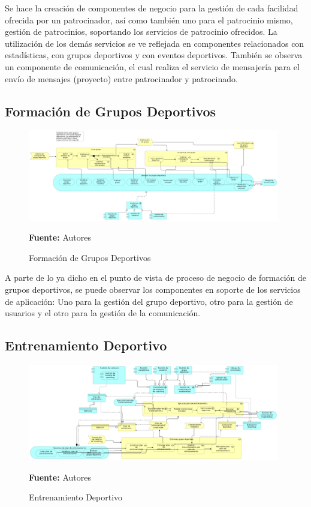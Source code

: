 Se hace la creación de componentes de negocio para la gestión de cada facilidad ofrecida por un patrocinador, así como también uno para el patrocinio mismo, gestión de patrocinios, soportando los servicios de patrocinio ofrecidos. La utilización de los demás servicios se ve reflejada en componentes relacionados con estadísticas, con grupos deportivos y con eventos deportivos. También se observa un componente de comunicación, el cual realiza el servicio de mensajería para el envío de mensajes (proyecto) entre patrocinador y patrocinado.


\subsection{Formación de Grupos Deportivos}

\begin{figure}[!htb]
  \begin{center}
    \includegraphics[width=11cm]{./imagenes/application_usage/formaciongruposdeportivos.png}
    \caption{Formación de Grupos Deportivos}
    \label{fig:au_formacion_grupos_deportivos}
    \textbf{Fuente:}  Autores
  \end{center}
\end{figure}

A parte de lo ya dicho en el punto de vista de proceso de negocio de formación de grupos deportivos, se puede observar los componentes en soporte de los servicios de aplicación: Uno para la gestión del grupo deportivo, otro para la gestión de usuarios y el otro para la gestión de la comunicación.

\subsection{Entrenamiento Deportivo}

\begin{figure}[!htb]
  \begin{center}
    \includegraphics[width=11cm]{./imagenes/application_usage/entrenamientodeportivo.png}
    \caption{Entrenamiento Deportivo}
    \label{fig:au_entrenamiento_deportivo}
    \textbf{Fuente:}  Autores
  \end{center}
\end{figure}

